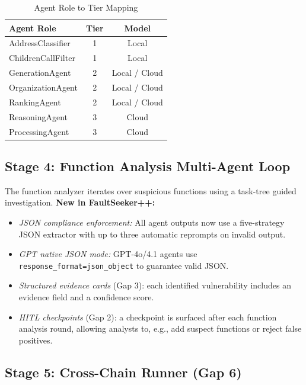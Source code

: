\documentclass[conference]{IEEEtran}
\begin{document}
\begin{table}[h]
\centering
\caption{Agent Role to Tier Mapping}
\label{tab:tier_map}
\begin{tabular}{lcc}
\toprule
\textbf{Agent Role} & \textbf{Tier} & \textbf{Model} \\
\midrule
AddressClassifier         & 1 & Local \\
ChildrenCallFilter        & 1 & Local \\
GenerationAgent           & 2 & Local / Cloud \\
OrganizationAgent         & 2 & Local / Cloud \\
RankingAgent              & 2 & Local / Cloud \\
ReasoningAgent            & 3 & Cloud \\
ProcessingAgent           & 3 & Cloud \\
\bottomrule
\end{tabular}
\end{table}

\subsection{Stage 4: Function Analysis Multi-Agent Loop}

The function analyzer iterates over suspicious functions using a
task-tree guided investigation.
\textbf{New in FaultSeeker++:}
\begin{itemize}
  \item \textit{JSON compliance enforcement:} All agent outputs now use
        a five-strategy JSON extractor with up to three automatic
        reprompts on invalid output.
  \item \textit{GPT native JSON mode:} GPT-4o/4.1 agents use
        \texttt{response\_format=json\_object} to guarantee valid JSON.
  \item \textit{Structured evidence cards} (Gap 3): each identified
        vulnerability includes an evidence field and a confidence score.
  \item \textit{HITL checkpoints} (Gap 2): a checkpoint is surfaced after
        each function analysis round, allowing analysts to, e.g., add
        suspect functions or reject false positives.
\end{itemize}

\subsection{Stage 5: Cross-Chain Runner (Gap 6)}
\end{document}
